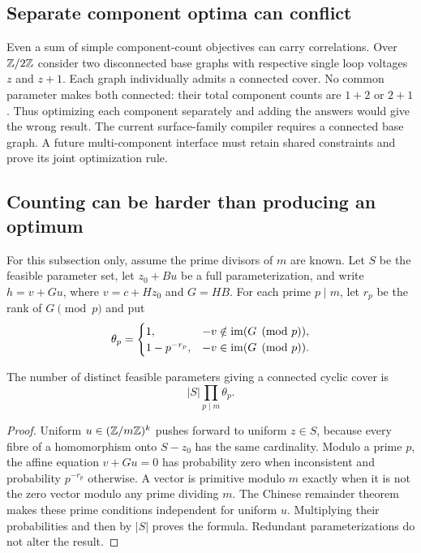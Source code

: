 \subsection{Separate component optima can conflict}

Even a sum of simple component-count objectives can carry correlations.
Over $\mathbb Z/2\mathbb Z$ consider two disconnected base graphs with respective
single loop voltages $z$ and $z+1$. Each graph individually admits a
connected cover. No common parameter makes both connected: their total
component counts are $1+2$ or $2+1$. Thus optimizing each component
separately and adding the answers would give the wrong result.
The current surface-family compiler requires a connected base graph.
A future multi-component interface must retain shared constraints and
prove its joint optimization rule.

\subsection{Counting can be harder than producing an optimum}

For this subsection only, assume the prime divisors of $m$ are known.
Let $S$ be the feasible parameter set, let $z_0+B u$ be a full
parameterization, and write $h=v+G u$, where $v=c+Hz_0$ and $G=HB$.
For each prime $p\mid m$, let $r_p$ be the rank of $G\pmod p$ and put
\[
 \theta_p=
 \begin{cases}
  1,&-v\notin\operatorname{im}(G\pmod p),\\
  1-p^{-r_p},&-v\in\operatorname{im}(G\pmod p).
 \end{cases}
\]

\begin{proposition}
\label{prop:counting}
The number of distinct feasible parameters giving a connected cyclic
cover is
\begin{equation}
 |S|\prod_{p\mid m}\theta_p.\label{eq:connected-count}
\end{equation}
\end{proposition}
\begin{proof}
Uniform $u\in(\mathbb Z/m\mathbb Z)^k$ pushes forward to uniform $z\in S$, because
every fibre of a homomorphism onto $S-z_0$ has the same cardinality.
Modulo a prime $p$, the affine equation $v+Gu=0$ has probability zero
when inconsistent and probability $p^{-r_p}$ otherwise. A vector is
primitive modulo $m$ exactly when it is not the zero vector modulo any
prime dividing $m$. The Chinese remainder theorem makes these prime
conditions independent for uniform $u$. Multiplying their probabilities
and then by $|S|$ proves the formula. Redundant parameterizations do not
alter the result.
\end{proof}


